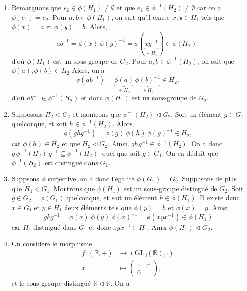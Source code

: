 \documentclass[./main]{subfiles}
\begin{document}
  \begin{enumerate}
    \item Remarquons que $e_2 \in \phi(H_1) \neq \emptyset$ et que $e_1 \in \phi^{-1}(H_2) \neq \emptyset$ car on a $\phi(e_1) = e_2$.
      Pour $a,b \in \phi(H_1)$, on sait qu'il existe $x,y \in H_1$ tels que $\phi(x) = a$ et $\phi(y) = b$.
      Alors, \[
        ab^{-1} = \phi(x)\:\phi(y)^{-1} = \phi(\underbrace{xy^{-1}}_{\in H_1}) \in \phi(H_1)
      ,\]
      d'où $\phi(H_1)$ est un sous-groupe de $G_2$.
      Pour $a,b \in \phi^{-1}(H_2)$, on sait que $\phi(a),\phi(b)\in H_2$
      Alors, on a \[
        \phi(ab^{-1}) = \underbrace{\phi(a)}_{\in H_2}\:\underbrace{\phi(b)^{-1}}_{\in H_2} \in H_2
      ,\]
      d'où $ab^{-1} \in \phi^{-1}(H_2)$ et donc $\phi(H_1)$ est un sous-groupe de $G_2$.
    \item Supposons $H_2 \triangleleft G_2$ et montrons que $\phi^{-1}(H_2) \triangleleft G_2$.
      Soit un élément $g \in G_1$ quelconque, et soit $h \in \phi ^{-1}(H_2)$.
      Alors, \[
      \phi(ghg^{-1}) = \phi(g)\: \phi(h)\: \phi(g)^{-1} \in H_2
      ,\] car $\phi(h) \in H_2$ et que $H_2 \triangleleft G_2$.
      Ainsi, $g h g^{-1} \in \phi ^{-1}(H_2)$.
      On a donc $g \:\phi ^{-1}(H_2)\: g^{-1} \subseteq \phi^{-1}(H_2)$, quel que soit $g \in G_1$.
      On en déduit que $\phi ^{-1}(H_2)$ est distingué dans $G_1$.
    \item Suppsons $\phi$ surjective, on a donc l'égalité $\phi(G_1) = G_2$.
      Supposons de plus que $H_1 \triangleleft G_1$.
      Montrons que $\phi(H_1)$ est un sous-groupe distingué de $G_2$.
      Soit $g \in G_2 = \phi(G_1)$ quelconque, et soit un élément $h \in \phi(H_1)$.
      Il existe donc $x \in G_1$ et $y \in H_1$ deux éléments tels que $\phi(y) = h$ et $\phi(x) = g$.
      Ainsi \[
        g h g^{-1} = \phi(x)\: \phi(y)\:\phi(x)^{-1} = \phi(x y x^{-1}) \in \phi(H_1)
      \] car $H_1$ distingué dans $G_1$ et donc $x y x^{-1} \in H_1$.
      Ainsi $\phi(H_1) \triangleleft G_2$.
    \item On considère le morphisme \begin{align*}
        f: (\mathds{R},+) &\longrightarrow (\mathrm{GL}_2(\mathds{R}), \cdot ) \\
        x &\longmapsto \begin{pmatrix} 1 & x\\ 0 & 1 \end{pmatrix}
      ,\end{align*}
      et le sous-groupe distingué $\mathds{R} \triangleleft \mathds{R}$.
      On a \[
\]
\end{enumerate}
\end{document}
